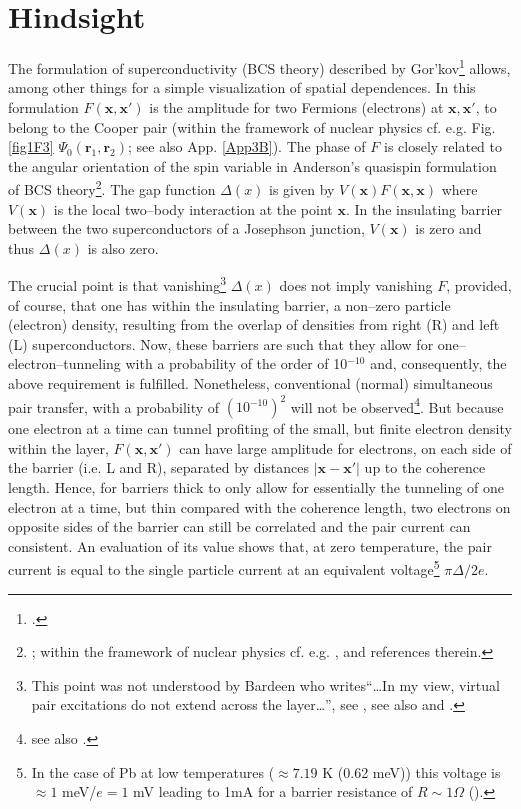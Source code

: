 \section{Hindsight}\label{C3AppE}
The formulation of superconductivity (BCS theory) described by Gor'kov\footnote{\cite{Gorkov:58,Gorkov:59}.} allows, among other things for a simple visualization of spatial dependences. In this formulation $F(\mathbf{x},\mathbf{x}')$ is the amplitude for two Fermions (electrons) at $\mathbf{x},\mathbf{x}'$, to belong to the Cooper pair (within the framework of nuclear physics cf. e.g. Fig. \ref{fig1F3} $\Psi_0(\mathbf{r}_1,\mathbf{r}_2)$; see also App. \ref{App3B}). The phase of $F$ is closely  related to the angular orientation of the spin variable  in Anderson's quasispin formulation of BCS theory\footnote{\cite{Anderson:58b}; within the framework of nuclear physics cf. e.g. \cite{Bohr:88}, \cite{Potel:13b} and references therein.}. The gap function $\Delta(x)$ is given by $V(\mathbf{x})F(\mathbf{x},\mathbf{x})$ where $V(\mathbf{x})$ is the local two--body interaction at the point $\mathbf x$. In the insulating barrier between the two superconductors of a Josephson junction, $V(\mathbf{x})$ is zero and thus $\Delta(x)$ is also zero. 



The crucial point is that vanishing\footnote{This point was not understood by Bardeen who writes``\dots In my view, virtual pair excitations do not extend across the layer\dots'', see \cite{McDonald:01}, see also \cite{Bardeen:61} and \cite{Bardeen:62}.} $\Delta(x)$ does not imply vanishing $F$, provided, of course, that one has within the insulating barrier, a non--zero particle (electron) density, resulting from the overlap of densities from right (R) and left (L) superconductors. Now, these barriers are such that they allow for one--electron--tunneling with a probability of the order of 10$^{-10}$ and, consequently, the above requirement is fulfilled. Nonetheless, conventional (normal) simultaneous pair transfer, with a probability of $(10^{-10})^2$ will not be observed\footnote{\cite{Pippard:12} see also \cite{McDonald:01}.}. But because one electron at a time can tunnel profiting of the small, but finite electron density within the layer,   $F(\mathbf{x},\mathbf{x}')$ can have large amplitude for electrons, on each side of the barrier (i.e. L and R), separated by distances $|\mathbf{x}-\mathbf{x}'|$ up to the coherence length. Hence, for barriers thick to only allow for essentially the tunneling of one electron at a time, but thin compared with the coherence length, two electrons on opposite sides of the barrier can still be correlated and the pair current can  consistent. An evaluation of its 
value shows that, at zero temperature, the pair current is equal to the single particle current at an equivalent voltage\footnote{In the case of Pb at low temperatures ($\approx7.19$ K (0.62 meV)) this voltage is $\approx 1$ meV/$e=1$ mV leading to 1mA for a barrier resistance of $R\sim1\Omega$ (\cite{Ambegaokar:63,McDonald:01,Tinkham:96}).} $\pi\Delta/2e$.


